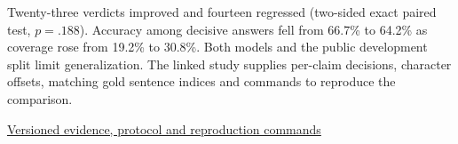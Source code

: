 \noindent Twenty-three verdicts improved and fourteen regressed (two-sided exact paired test, $p=.188$). Accuracy among decisive answers fell from 66.7\% to 64.2\% as coverage rose from 19.2\% to 30.8\%. Both models and the public development split limit generalization. The linked study supplies per-claim decisions, character offsets, matching gold sentence indices and commands to reproduce the comparison.\par
\smallskip\noindent\href{https://github.com/Rahulchaube1/veritas/blob/v0.2.0/docs/verification-v0.2.md}{Versioned evidence, protocol and reproduction commands}
